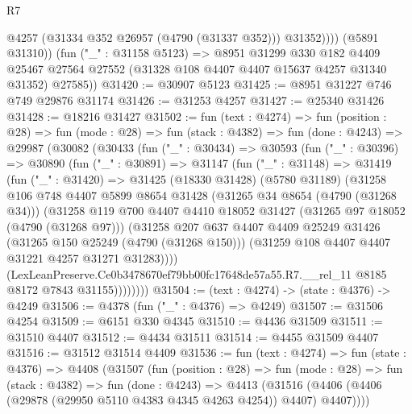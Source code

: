 \begin{lexlean}{R7}
\begin{coremodule}
                @4257
                (@31334 @352 @26957 (@4790 (@31337 @352)))
                @31352))))
        (@5891 @31310))
      (fun ("_" : @31158 @5123) =>
      @8951
        @31299
        @330
        @182
        @4409
        @25467
        @27564
        @27552
        (@31328 @108 @4407 @4407 @15637 @4257 @31340 @31352)
        @27585))
@31420 := @30907 @5123
@31425 := @8951 @31227 @746 @749 @29876 @31174
@31426 := @31253 @4257
@31427 := @25340 @31426
@31428 := @18216 @31427
@31502 := fun (text : @4274) =>
  fun (position : @28) =>
  fun (mode : @28) =>
  fun (stack : @4382) =>
  fun (done : @4243) =>
  @29987
    (@30082
      (@30433
        (fun ("_" : @30434) =>
        @30593
          (fun ("_" : @30396) =>
          @30890
            (fun ("_" : @30891) =>
            @31147
              (fun ("_" : @31148) =>
              @31419
                (fun ("_" : @31420) =>
                @31425
                  (@18330 @31428)
                  (@5780 @31189)
                  (@31258
                    @106
                    @748
                    @4407
                    @5899
                    @8654
                    @31428
                    (@31265 @34 @8654 (@4790 (@31268 @34)))
                    (@31258
                      @119
                      @700
                      @4407
                      @4410
                      @18052
                      @31427
                      (@31265 @97 @18052 (@4790 (@31268 @97)))
                      (@31258
                        @207
                        @637
                        @4407
                        @4409
                        @25249
                        @31426
                        (@31265 @150 @25249 (@4790 (@31268 @150)))
                        (@31259 @108 @4407 @4407 @31221 @4257 @31271 @31283))))
                  (LexLeanPreserve.Ce0b3478670ef79bb00fc17648de57a55.R7.__rel_11
                    @8185
                    @8172
                    @7843
                    @31155))))))))
@31504 := (text : @4274) -> (state : @4376) -> @4249
@31506 := @4378 (fun ("_" : @4376) => @4249)
@31507 := @31506 @4254
@31509 := @6151 @330 @4345
@31510 := @4436 @31509
@31511 := @31510 @4407
@31512 := @4434 @31511
@31514 := @4455 @31509 @4407
@31516 := @31512 @31514 @4409
@31536 := fun (text : @4274) =>
  fun (state : @4376) =>
  @4408
    (@31507
      (fun (position : @28) =>
      fun (mode : @28) =>
      fun (stack : @4382) =>
      fun (done : @4243) =>
      @4413 (@31516 (@4406 (@4406 (@29878 (@29950 @5110 @4383 @4345 @4263 @4254)) @4407) @4407))))

\end{coremodule}
\end{lexlean}
